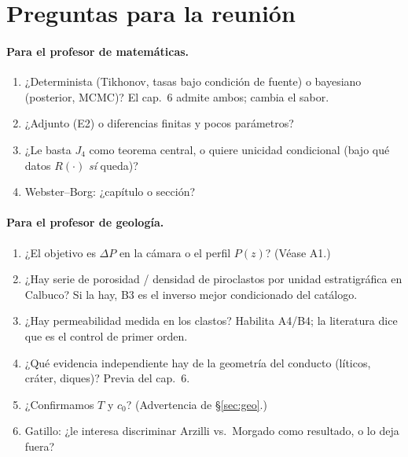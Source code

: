 \documentclass[11pt,a4paper]{article}
\theoremstyle{plain}
\theoremstyle{definition}
\theoremstyle{remark}
\begin{document}
\section{Preguntas para la reunión}
\label{sec:preguntas}

\paragraph{Para el profesor de matemáticas.}
\begin{enumerate}
\item ¿Determinista (Tikhonov, tasas bajo condición de fuente) o
  bayesiano (posterior, MCMC)? El cap.\ 6 admite ambos; cambia
  el sabor.
\item ¿Adjunto (E2) o diferencias finitas y pocos parámetros?
\item ¿Le basta $J_4$ como teorema central, o quiere unicidad
  condicional (bajo qué datos $R(\cdot)$ \emph{sí} queda)?
\item Webster--Borg: ¿capítulo o sección?
\end{enumerate}

\paragraph{Para el profesor de geología.}
\begin{enumerate}
\item ¿El objetivo es $\Delta P$ en la cámara o el perfil
  $P(z)$? (Véase A1.)
\item ¿Hay serie de porosidad / densidad de piroclastos por
  unidad estratigráfica en Calbuco? Si la hay, B3 es el inverso
  mejor condicionado del catálogo.
\item ¿Hay permeabilidad medida en los clastos? Habilita A4/B4;
  la literatura dice que es el control de primer orden.
\item ¿Qué evidencia independiente hay de la geometría del
  conducto (líticos, cráter, diques)? Previa del cap.\ 6.
\item ¿Confirmamos $T$ y $c_0$? (Advertencia de
  \S\ref{sec:geo}.)
\item Gatillo: ¿le interesa discriminar Arzilli vs.\ Morgado
  como resultado, o lo deja fuera?
\end{enumerate}
\end{document}
